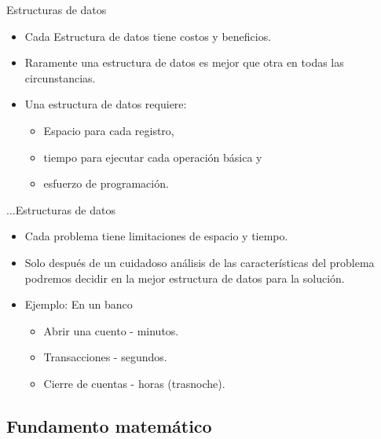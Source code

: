 \documentclass[aspectratio=169]{beamer}
\begin{document}
\begin{frame}{Estructuras de datos}
  \begin{itemize}
    \item Cada Estructura de datos tiene costos y beneficios.
    \item Raramente una estructura de datos es mejor que otra en todas las circunstancias.
    \item Una estructura de datos requiere:
    \begin{itemize}
      \item Espacio para cada registro,
      \item tiempo para ejecutar cada operación básica y
      \item esfuerzo de programación.
    \end{itemize}
  \end{itemize}
\end{frame}

\begin{frame}{...Estructuras de datos}
  \begin{itemize}
    \item Cada problema tiene limitaciones de espacio y tiempo.
    \item Solo después de un cuidadoso análisis de las características del problema podremos decidir en la mejor estructura de datos para la solución.
    \item Ejemplo: En un banco
    \begin{itemize}
      \item Abrir una cuento - minutos.
      \item Transacciones - segundos.
      \item Cierre de cuentas - horas (trasnoche).
    \end{itemize}
  \end{itemize}
\end{frame}

\subsection{Fundamento matemático}
\end{document}
